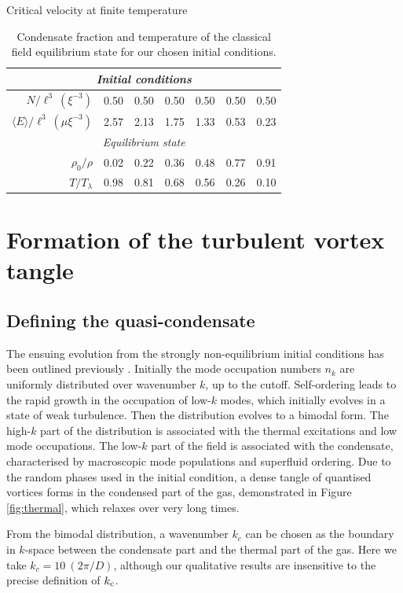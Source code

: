 \begin{chapter}{\label{cha:nonequib}Critical velocity at finite temperature}
\begin{table}
\centering
\begin{tabular}{rcccccc}
\multicolumn{7}{c}{\it Initial conditions} \\
\hline
\rule{0pt}{3ex}$N/\ell^3~(\xi^{-3})$           & 0.50 & 0.50 & 0.50 & 0.50 & 0.50 & 0.50 \\
$\langle E \rangle/\ell^3~(\mu \xi^{-3})$  & 2.57 & 2.13 & 1.75 & 1.33 & 0.53 & 0.23 \\
\multicolumn{7}{c}{\it Equilibrium state} \\
\hline
\rule{0pt}{3ex}$\rho_0/\rho$        & 0.02 & 0.22 & 0.36 & 0.48 & 0.77 & 0.91 \\
$T/T_\lambda$        & 0.98 & 0.81 & 0.68 & 0.56 & 0.26 & 0.10
\end{tabular}
\caption{Condensate fraction and temperature of the classical field equilibrium state for our chosen initial conditions.}
\label{tbl:cond_frac}
\end{table}

\section{Formation of the turbulent vortex tangle}
\subsection{Defining the quasi-condensate}
The ensuing evolution from the strongly non-equilibrium initial conditions has been outlined previously \cite{PhysRevA.66.013603,pattinson_2014}.  Initially the mode occupation numbers $n_k$ are uniformly distributed over wavenumber $k$, up to the cutoff.  Self-ordering leads to the rapid growth in the occupation of low-$k$ modes, which initially evolves in a state of weak turbulence.  Then the distribution evolves to a bimodal form.
The high-$k$ part of the distribution is associated with the
thermal excitations and low mode occupations. The low-$k$ part of the field is associated with the condensate, characterised by macroscopic mode populations and superfluid ordering. Due to the random phases used in the initial condition, a dense tangle of quantised vortices forms in the condensed part of the gas, demonstrated in Figure \ref{fig:thermal}, which relaxes over very long times.

From the bimodal distribution, a wavenumber $k_c$ can be chosen as the boundary in $k$-space between the condensate part and the thermal part of the gas.  Here we take $k_c = 10~(2\pi/D)$, although our qualitative results are insensitive to the precise definition of $k_{\rm c}$. 


\end{chapter}
